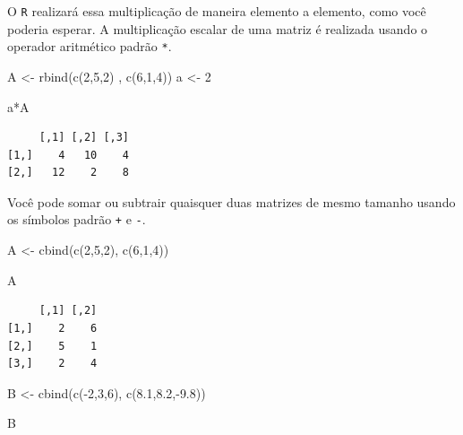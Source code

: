 \documentclass[
  letterpaper,
  DIV=11,
  numbers=noendperiod]{scrreprt}
\newenvironment{Shaded}{\begin{snugshade}}{\end{snugshade}}
\newcommand{\DecValTok}[1]{\textcolor[rgb]{0.68,0.00,0.00}{#1}}
\newcommand{\FloatTok}[1]{\textcolor[rgb]{0.68,0.00,0.00}{#1}}
\newcommand{\FunctionTok}[1]{\textcolor[rgb]{0.28,0.35,0.67}{#1}}
\newcommand{\NormalTok}[1]{\textcolor[rgb]{0.00,0.23,0.31}{#1}}
\newcommand{\OtherTok}[1]{\textcolor[rgb]{0.00,0.23,0.31}{#1}}
\newcommand{\SpecialCharTok}[1]{\textcolor[rgb]{0.37,0.37,0.37}{#1}}
\begin{document}
O \texttt{R} realizará essa multiplicação de maneira elemento a
elemento, como você poderia esperar. A multiplicação escalar de uma
matriz é realizada usando o operador aritmético padrão \texttt{*}.

\begin{Shaded}
\begin{Highlighting}[]
\NormalTok{A }\OtherTok{\textless{}{-}} \FunctionTok{rbind}\NormalTok{(}\FunctionTok{c}\NormalTok{(}\DecValTok{2}\NormalTok{,}\DecValTok{5}\NormalTok{,}\DecValTok{2}\NormalTok{) , }\FunctionTok{c}\NormalTok{(}\DecValTok{6}\NormalTok{,}\DecValTok{1}\NormalTok{,}\DecValTok{4}\NormalTok{))}
\NormalTok{a }\OtherTok{\textless{}{-}} \DecValTok{2}

\NormalTok{a}\SpecialCharTok{*}\NormalTok{A}
\end{Highlighting}
\end{Shaded}

\begin{verbatim}
     [,1] [,2] [,3]
[1,]    4   10    4
[2,]   12    2    8
\end{verbatim}

Você pode somar ou subtrair quaisquer duas matrizes de mesmo tamanho
usando os símbolos padrão \texttt{+} e \texttt{-}.

\begin{Shaded}
\begin{Highlighting}[]
\NormalTok{A }\OtherTok{\textless{}{-}} \FunctionTok{cbind}\NormalTok{(}\FunctionTok{c}\NormalTok{(}\DecValTok{2}\NormalTok{,}\DecValTok{5}\NormalTok{,}\DecValTok{2}\NormalTok{), }\FunctionTok{c}\NormalTok{(}\DecValTok{6}\NormalTok{,}\DecValTok{1}\NormalTok{,}\DecValTok{4}\NormalTok{))}

\NormalTok{A}
\end{Highlighting}
\end{Shaded}

\begin{verbatim}
     [,1] [,2]
[1,]    2    6
[2,]    5    1
[3,]    2    4
\end{verbatim}

\begin{Shaded}
\begin{Highlighting}[]
\NormalTok{B }\OtherTok{\textless{}{-}}  \FunctionTok{cbind}\NormalTok{(}\FunctionTok{c}\NormalTok{(}\SpecialCharTok{{-}}\DecValTok{2}\NormalTok{,}\DecValTok{3}\NormalTok{,}\DecValTok{6}\NormalTok{), }\FunctionTok{c}\NormalTok{(}\FloatTok{8.1}\NormalTok{,}\FloatTok{8.2}\NormalTok{,}\SpecialCharTok{{-}}\FloatTok{9.8}\NormalTok{))}

\NormalTok{B}
\end{Highlighting}
\end{Shaded}
\end{document}
